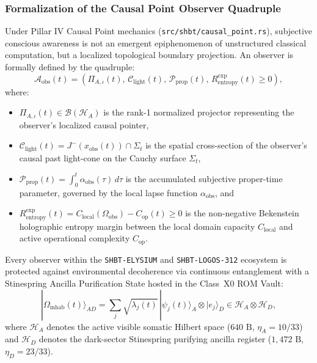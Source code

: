 \documentclass[11pt,onecolumn]{article}
\begin{document}
\subsubsection{Formalization of the Causal Point Observer Quadruple}
Under Pillar IV Causal Point mechanics (\texttt{src/shbt/causal\_point.rs}), subjective conscious awareness is not an emergent epiphenomenon of unstructured classical computation, but a localized topological boundary projection. An observer is formally defined by the quadruple:
\begin{equation}
\mathcal{A}_{\text{obs}}(t) = \left( \Pi_{A,\iota}(t),\, \mathcal{C}_{\text{light}}(t),\, \mathcal{P}_{\text{prop}}(t),\, R_{\text{entropy}}^{\text{exp}}(t) \ge 0 \right),
\label{eq:observer_quadruple}
\end{equation}
where:
\begin{itemize}
    \item $\Pi_{A,\iota}(t) \in \mathcal{B}(\mathcal{H}_A)$ is the rank-1 normalized projector representing the observer's localized causal pointer,
    \item $\mathcal{C}_{\text{light}}(t) = J^-(x_{\text{obs}}(t)) \cap \Sigma_t$ is the spatial cross-section of the observer's causal past light-cone on the Cauchy surface $\Sigma_t$,
    \item $\mathcal{P}_{\text{prop}}(t) = \int_0^t \alpha_{\text{obs}}(\tau)\, d\tau$ is the accumulated subjective proper-time parameter, governed by the local lapse function $\alpha_{\text{obs}}$, and
    \item $R_{\text{entropy}}^{\text{exp}}(t) = C_{\text{local}}(\Omega_{\text{obs}}) - C_{\text{op}}(t) \ge 0$ is the non-negative Bekenstein holographic entropy margin between the local domain capacity $C_{\text{local}}$ and active operational complexity $C_{\text{op}}$.
\end{itemize}

Every observer within the \texttt{SHBT-ELYSIUM} and \texttt{SHBT-LOGOS-312} ecosystem is protected against environmental decoherence via continuous entanglement with a Stinespring Ancilla Purification State hosted in the Class~X0 ROM Vault:
\begin{equation}
|\Omega_{\text{inhab}}(t)\rangle_{AD} = \sum_{j} \sqrt{\lambda_j(t)}\, |\psi_j(t)\rangle_A \otimes |e_j\rangle_D \in \mathcal{H}_A \otimes \mathcal{H}_D,
\label{eq:stinespring_purification_state}
\end{equation}
where $\mathcal{H}_A$ denotes the active visible somatic Hilbert space ($640\text{ B}$, $\eta_A = 10/33$) and $\mathcal{H}_D$ denotes the dark-sector Stinespring purifying ancilla register ($1{,}472\text{ B}$, $\eta_D = 23/33$).
\end{document}
